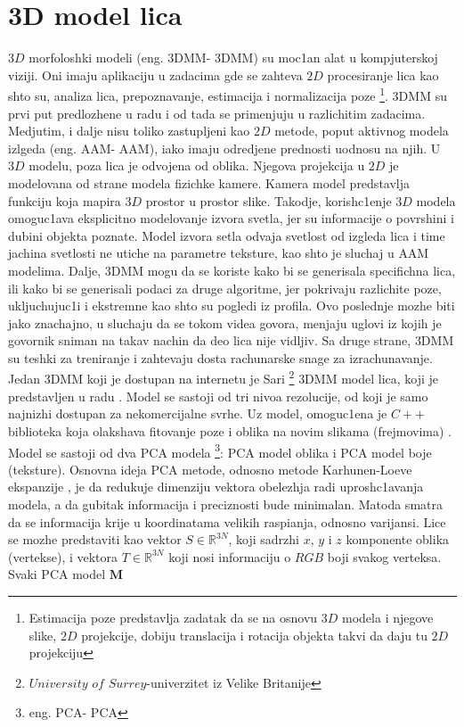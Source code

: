 \documentclass[a4paper, openany, oneside, 11pt]{book}
\begin{document}
\section[$3D$ model lica]{$\mathbf{3D}$ model lica}
$3D$  morfoloshki modeli  (eng. \acrlong{3DMM}- \acrshort{3DMM}) su moc1an alat u kompjuterskoj viziji. Oni imaju aplikaciju u zadacima gde se zahteva $2D$ procesiranje lica kao shto su, analiza lica, prepoznavanje, estimacija i normalizacija poze \footnote{Estimacija poze predstavlja zadatak da se na osnovu $3D$ modela i njegove slike, $2D$ projekcije, dobiju translacija i rotacija objekta takvi da daju tu $2D$ projekciju}. \acrshort{3DMM} su prvi put predlozhene u radu \cite{3DMM} i od tada se primenjuju u razlichitim zadacima. Medjutim, i dalje nisu toliko zastupljeni kao $2D$ metode, poput aktivnog modela izlgeda \cite{AAM} (eng. \acrlong{AAM}- \acrshort{AAM}), iako imaju odredjene prednosti uodnosu na njih. U $3D$ modelu, poza lica je odvojena od oblika. Njegova projekcija u $2D$ je modelovana od strane modela fizichke kamere. Kamera model predstavlja funkciju koja mapira $3D$ prostor u prostor slike. Takodje, korish\-c1enje $3D$ modela omoguc1ava eksplicitno modelovanje izvora svetla, jer su informacije o povrshini i dubini objekta poznate. Model izvora setla odvaja svetlost od izgleda lica i time jachina svetlosti ne utiche na parametre teksture, kao shto je sluchaj u \acrshort{AAM} modelima. Dalje, \acrshort{3DMM} mogu da se koriste kako bi se generisala specifichna lica, ili kako bi se generisali podaci za druge algoritme, jer pokrivaju razlichite poze, ukljuchujuc1i i ekstremne kao shto su pogledi iz profila. Ovo poslednje mozhe biti jako znachajno, u sluchaju da se tokom videa govora, menjaju uglovi iz kojih je govornik sniman na takav nachin da deo lica nije vidljiv. Sa druge strane, \acrshort{3DMM} su teshki za treniranje i zahtevaju dosta rachunarske snage za izrachunavanje.\\
Jedan \acrshort{3DMM} koji je dostupan na internetu je Sari \footnote{$University$ $of$ $Surrey$-univerzitet iz Velike Britanije} \acrshort{3DMM} model lica, koji je predstavljen u radu \cite{SFM}. Model se sastoji od tri nivoa rezolucije, od koji je samo najnizhi dostupan za nekomercijalne svrhe. Uz model, omoguc1ena je $C++$ biblioteka koja olakshava fitovanje poze i oblika na novim slikama (frejmovima) \cite{eos}.\\
Model se sastoji od dva \acrshort{PCA} modela \footnote{eng. \acrshort{PCA}- \acrlong{PCA}}: \acrshort{PCA} model oblika i \acrshort{PCA} model boje (teksture). Osnovna ideja \acrshort{PCA} metode, odnosno metode Karhunen-Loeve ekspanzije \cite{POpredavanja}, je da redukuje dimenziju vektora obelezhja radi uprosh\-c1avanja modela, a da gubitak informacija i preciznosti bude minimalan. Matoda smatra da se informacija krije u koordinatama velikih raspianja, odnosno varijansi. Lice se mozhe predstaviti kao vektor $S\in\mathbb{R}^{3N}$, koji sadrzhi $x$, $y$ i $z$ komponente oblika (vertekse), i vektora $T\in\mathbb{R}^{3N}$ koji nosi informaciju o $RGB$ boji svakog verteksa. Svaki \acrshort{PCA} model $\mathbf{M}$
\end{document}
